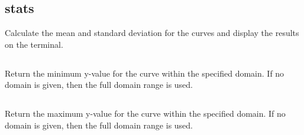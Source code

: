 \documentclass[letterpaper,10pt,english]{sphinxmanual}
\begin{document}
\begin{sphinxVerbatim}[commandchars=\\\{\}]
\PYG{p}{[}\PYG{p}{]}   
\end{sphinxVerbatim}


\subsection{stats}
\label{\detokenize{curve_inquiry_cmds:stats}}
Calculate the mean and standard deviation for the curves and display the results on the terminal.

\begin{sphinxVerbatim}[commandchars=\\\{\}]
\PYG{p}{[}\PYG{p}{]}  
\end{sphinxVerbatim}


\subsection{}
\label{\detokenize{curve_inquiry_cmds:getymin-2-4-2}}
Return the minimum y-value for the curve within the specified domain. If no domain is given, then the full domain range is used.

\begin{sphinxVerbatim}[commandchars=\\\{\}]
\PYG{p}{[}\PYG{p}{]}   \PYG{p}{[} \PYG{p}{]}
\end{sphinxVerbatim}


\subsection{}
\label{\detokenize{curve_inquiry_cmds:getymax-2-4-2}}
Return the maximum y-value for the curve within the specified domain. If no domain is given, then the full domain range is used.

\begin{sphinxVerbatim}[commandchars=\\\{\}]
\PYG{p}{[}\PYG{p}{]}   \PYG{p}{[} \PYG{p}{]}
\end{sphinxVerbatim}
\end{document}
